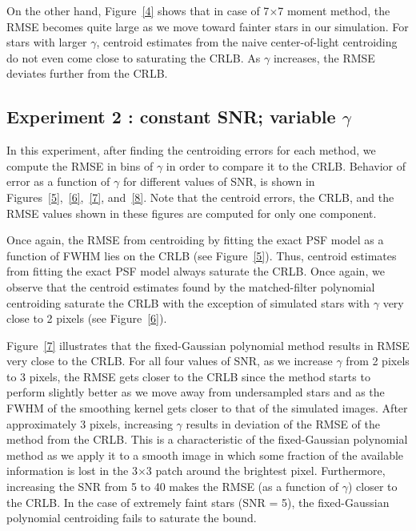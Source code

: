 \documentclass[onecolumn]{aastex61}
\newcommand{\todo}[1]{{\textcolor{dred}{ #1}}}
\begin{document}
\todo{On the other hand, Figure~\ref{4} shows that in case of 7$\times$7 moment method, the RMSE becomes quite large as we move toward fainter stars in our simulation.
For stars with larger $\gamma$, centroid estimates from the naive center-of-light 
centroiding do not even come close to saturating the CRLB. As $\gamma$ increases, the 
RMSE deviates further from the CRLB.} 

\todo{\subsection{Experiment 2 : constant SNR; variable $\gamma$}}

In this experiment, after finding the centroiding errors for each method, we
compute the RMSE in bins of $\gamma$ in order to compare it to the CRLB. 
Behavior of error as a function of $\gamma$ for different values of SNR,
is shown in Figures~\ref{5},~\ref{6},~\ref{7}, and~\ref{8}. \todo{Note that the centroid errors, the CRLB, and the RMSE values shown in these figures are computed for only one component.}
 
Once again, the RMSE from centroiding by fitting the exact PSF model as a function of FWHM lies on the CRLB (see Figure~\ref{5}). 
Thus, centroid estimates from fitting the exact PSF model always saturate the CRLB. Once again, we observe that the centroid estimates found by the matched-filter polynomial centroiding saturate the CRLB with the
exception of simulated stars with $\gamma$ very close to 2 pixels (see Figure~\ref{6}).

Figure~\ref{7} illustrates that the \todo{fixed-Gaussian} polynomial method results in RMSE very close to the CRLB. For all four values of SNR, as we increase $\gamma$ from 2 pixels to 3 pixels, the RMSE gets closer to the CRLB since the method starts to perform
slightly better as we move away from undersampled stars and as the FWHM of the smoothing kernel gets closer to that of the simulated images.
After approximately 3 pixels, increasing $\gamma$ results in deviation of the RMSE of the method from the CRLB. \todo{This is a characteristic of the fixed-Gaussian polynomial method as we apply it to a smooth image in which some fraction of the available information is lost in the 3$\times$3 patch around the brightest pixel.} Furthermore, increasing the SNR from 5 to 40 makes the RMSE (as a function of $\gamma$) closer to the CRLB. 
\todo{In the case of extremely faint stars (SNR = 5), the fixed-Gaussian polynomial centroiding fails to saturate the bound.}
\end{document}

